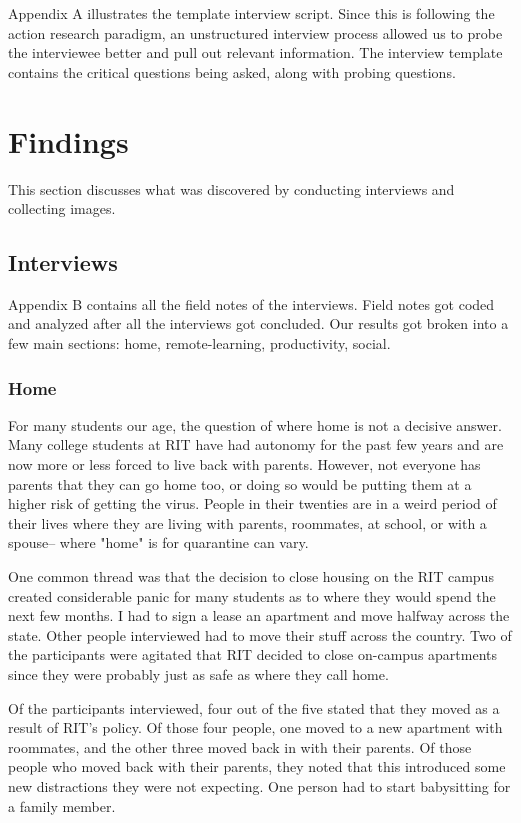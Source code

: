 \documentclass[12pt,
 reprint,
nofootinbib,
 amsmath,amssymb,
 aps,
floatfix,
]{revtex4-2}
\begin{document}
Appendix A illustrates the template interview script.
Since this is following the action research paradigm, an unstructured interview process allowed us to probe the interviewee better and pull out relevant information.
The interview template contains the critical questions being asked, along with probing questions.


\section{Findings}

This section discusses what was discovered by conducting interviews and collecting images.

\subsection{Interviews}

Appendix B contains all the field notes of the interviews. Field notes got coded and analyzed after all the interviews got concluded. Our results got broken into a few main sections: home, remote-learning, productivity, social.


\subsubsection{Home}

For many students our age, the question of where home is not a decisive answer.
Many college students at RIT have had autonomy for the past few years and are now more or less forced to live back with parents. However, not everyone has parents that they can go home too, or doing so would be putting them at a higher risk of getting the virus. People in their twenties are in a weird period of their lives where they are living with parents, roommates, at school, or with a spouse-- where "home" is for quarantine can vary.

One common thread was that the decision to close housing on the RIT campus created considerable panic for many students as to where they would spend the next few months. I had to sign a lease an apartment and move halfway across the state. Other people interviewed had to move their stuff across the country.
Two of the participants were agitated that RIT decided to close on-campus apartments since they were probably just as safe as where they call home. 

Of the participants interviewed, four out of the five stated that they moved as a result of RIT's policy. Of those four people, one moved to a new apartment with roommates, and the other three moved back in with their parents. Of those people who moved back with their parents, they noted that this introduced some new distractions they were not expecting. One person had to start babysitting for a family member. 
\end{document}
